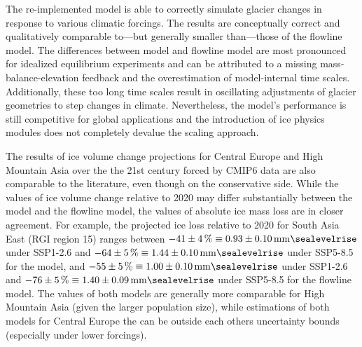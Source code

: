 The re-implemented \vas{} model is able to correctly simulate glacier changes in response to various climatic forcings. The results are conceptually correct and qualitatively comparable to---but generally smaller than---those of the flowline model. The differences between \vas{} model and flowline model are most pronounced for idealized equilibrium experiments and can be attributed to a missing mass-balance-elevation feedback and the overestimation of model-internal time scales. Additionally, these too long time scales result in oscillating adjustments of glacier geometries to step changes in climate. Nevertheless, the \vas{} model's performance is still competitive for global applications and the introduction of ice physics modules does not completely devalue the scaling approach.

The results of ice volume change projections for Central Europe and High Mountain Asia over the the 21st century forced by CMIP6 data are also comparable to the literature, even though on the conservative side. While the values of ice volume change relative to 2020 may differ substantially between the \vas{} model and the flowline model, the values of absolute ice mass loss are in closer agreement. For example, the projected ice loss relative to 2020 for South Asia East (RGI region 15) ranges between $-41\SI{\pm4}{\percent} \equiv 0.93\SI{\pm0.10}{\milli\meter\sealevelrise}$ under SSP1-2.6 and $-64\SI{\pm5}{\percent} \equiv 1.44\SI{\pm0.10}{\milli\meter\sealevelrise}$ under SSP5-8.5 for the \vas{} model, and $-55\SI{\pm5}{\percent} \equiv 1.00\SI{\pm0.10}{\milli\meter\sealevelrise}$ under SSP1-2.6 and $-76\SI{\pm5}{\percent} \equiv 1.40\SI{\pm0.09}{\milli\meter\sealevelrise}$ under SSP5-8.5 for the flowline model. The values of both models are generally more comparable for High Mountain Asia (given the larger population size), while estimations of both models for Central Europe the can be outside each others uncertainty bounds (especially under lower forcings).



